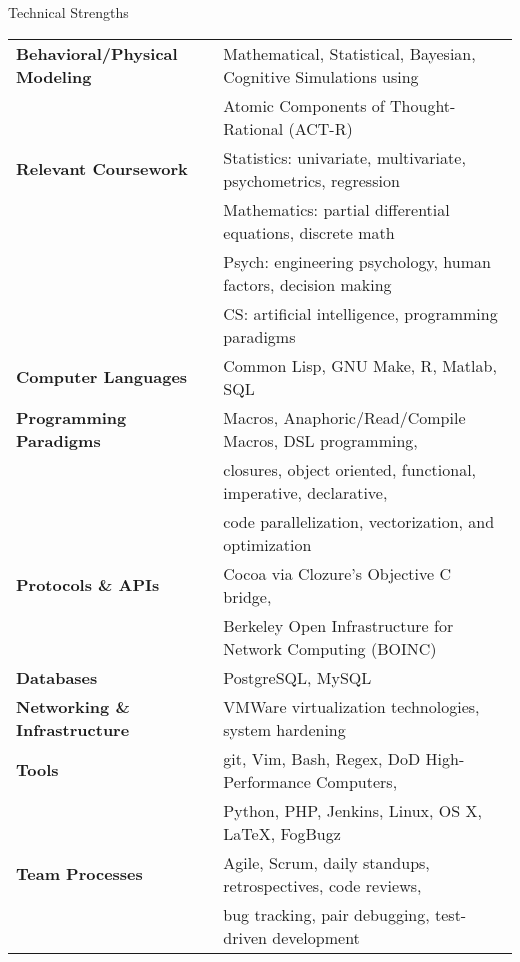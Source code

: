 

\begin{rSection}{Technical Strengths}
  \begin{tabular}{ @{} >{\bfseries}l @{\hspace{4ex}} l }
    Behavioral/Physical Modeling &	Mathematical, Statistical, Bayesian, Cognitive Simulations using \\
    &					Atomic Components of Thought-Rational (ACT-R) \\
    Relevant Coursework &		Statistics: univariate, multivariate, psychometrics, regression \\
    &					Mathematics: partial differential equations, discrete math \\
    &					Psych: engineering psychology, human factors, decision making \\ 
    &					CS: artificial intelligence, programming paradigms \\
    Computer Languages &		Common Lisp, GNU Make, R, Matlab, SQL \\
    Programming Paradigms &		Macros, Anaphoric/Read/Compile Macros, DSL programming, \\
    & 					closures, object oriented, functional, imperative, declarative, \\
    &					code parallelization, vectorization, and optimization \\
    Protocols \& APIs & 		Cocoa via Clozure's Objective C bridge, \\
    &					Berkeley Open Infrastructure for Network Computing (BOINC) \\
    Databases &				PostgreSQL, MySQL \\
    Networking \& Infrastructure &	VMWare virtualization technologies, system hardening \\
    Tools & 				git, Vim, Bash, Regex, DoD High-Performance Computers, \\
    &					Python, PHP, Jenkins, Linux, OS X, \LaTeX, FogBugz \\
    Team Processes & 			Agile, Scrum, daily standups, retrospectives, code reviews, \\
    & 					bug tracking, pair debugging, test-driven development \\
  \end{tabular}
\end{rSection}

